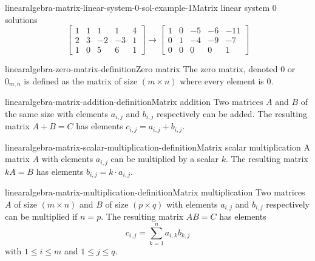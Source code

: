 \documentclass[preview]{standalone}
\begin{document}
\begin{snippetexample}{linearalgebra-matrix-linear-system-0-sol-example-1}{Matrix linear system 0 solutions}
    \[
        \begin{bmatrix}
            1 & 1 & 1 & 1 & 4 \\
            2 & 3 & -2 & -3 & 1 \\
            1 & 0 & 5 & 6 & 1
        \end{bmatrix}
        \rightarrow
        \begin{bmatrix}
            1 & 0 & -5 & -6 & -11 \\
            0 & 1 & -4 & -9 & -7 \\
            0 & 0 & 0 & 0 & 1
        \end{bmatrix}
    \]
\end{snippetexample}

\begin{snippetdefinition}{linearalgebra-zero-matrix-definition}{Zero matrix}
    The zero matrix, denoted \(0\) or \(0_{m,n}\)
    is defined as the matrix of size \((m \times n)\)
    where every element is \(0\).
\end{snippetdefinition}

\begin{snippetdefinition}{linearalgebra-matrix-addition-definition}{Matrix addition}
    Two matrices \(A\) and \(B\) of the same size
    with elements \(a_{i,j}\) and \(b_{i,j}\) respectively
    can be added. The resulting matrix \(A+B=C\)
    has elements \(c_{i,j} = a_{i,j} + b_{i,j}\).
\end{snippetdefinition}

\begin{snippetdefinition}{linearalgebra-matrix-scalar-multiplication-definition}{Matrix scalar multiplication}
    A matrix \(A\) with elements \(a_{i,j}\)
    can be multiplied by a scalar \(k\).
    The resulting matrix \(kA=B\) has elements
    \(b_{i,j} = k \cdot a_{i,j}\).
\end{snippetdefinition}

\begin{snippetdefinition}{linearalgebra-matrix-multiplication-definition}{Matrix multiplication}
    Two matrices \(A\) of size \((m \times n)\) and
    \(B\) of size \((p \times q)\)
    with elements \(a_{i,j}\) and \(b_{i,j}\) respectively
    can be multiplied if \(n=p\).
    The resulting matrix \(AB=C\) has elements
    \[
        c_{i,j} = \sum_{k=1}^n
        a_{i,k}b_{k,j}
    \]
    with \(1 \leq i \leq m\)
    and \(1 \leq j \leq q\).
\end{snippetdefinition}
\end{document}
